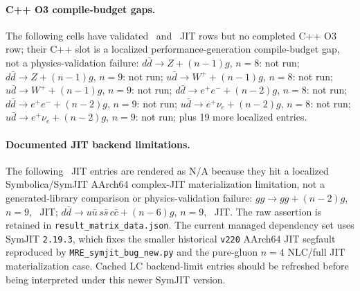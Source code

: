 \paragraph{C++ O3 compile-budget gaps.}
The following cells have validated \AC\ and \PAC\ JIT rows but no completed C++ O3 row; their C++ slot is a localized performance-generation compile-budget gap, not a physics-validation failure: $d\bar d\to Z+(n-1)g$, \(n=8\): not run; $d\bar d\to Z+(n-1)g$, \(n=9\): not run; $u\bar d\to W^++(n-1)g$, \(n=8\): not run; $u\bar d\to W^++(n-1)g$, \(n=9\): not run; $d\bar d\to e^+e^-+(n-2)g$, \(n=8\): not run; $d\bar d\to e^+e^-+(n-2)g$, \(n=9\): not run; $u\bar d\to e^+\nu_e+(n-2)g$, \(n=8\): not run; $u\bar d\to e^+\nu_e+(n-2)g$, \(n=9\): not run; plus 19 more localized entries.
\par\smallskip
\paragraph{Documented JIT backend limitations.}
The following \PAC\ JIT entries are rendered as N/A because they hit a localized Symbolica/SymJIT AArch64 complex-JIT materialization limitation, not a generated-library comparison or physics-validation failure: $gg\to gg+(n-2)g$, \(n=9\), \PAC\ JIT; $d\bar d\to u\bar{u}\,s\bar{s}\,c\bar{c}+(n-6)g$, \(n=9\), \PAC\ JIT.  The raw assertion is retained in \texttt{result\_matrix\_data.json}. The current managed dependency set uses SymJIT \texttt{2.19.3}, which fixes the smaller historical \texttt{v220} AArch64 JIT segfault reproduced by \texttt{MRE\_symjit\_bug\_new.py} and the pure-gluon \(n=4\) NLC/full JIT materialization case.  Cached LC backend-limit entries should be refreshed before being interpreted under this newer SymJIT version.
\par\smallskip